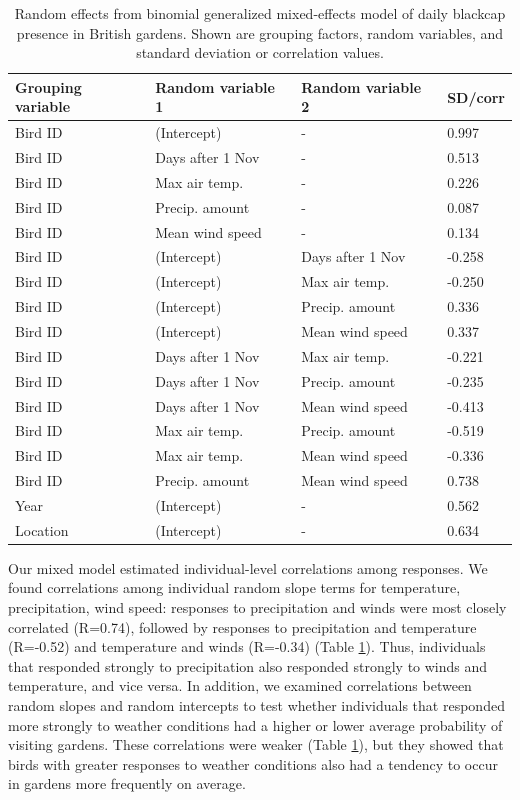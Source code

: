 \documentclass[a4paper, twoside]{templates/ociamthesis}
\begin{document}
\begin{table}[t]

\caption{\label{tab:indiv-model-table}Random effects from binomial generalized mixed-effects model of daily blackcap presence in British gardens. Shown are grouping factors, random variables, and standard deviation or correlation values.}
\centering
\begin{tabular}{l|l|l|l}
\hline
Grouping variable & Random variable 1 & Random variable 2 & SD/corr\\
\hline
Bird ID & (Intercept) & - & 0.997\\
\hline
Bird ID & Days after 1 Nov & - & 0.513\\
\hline
Bird ID & Max air temp. & - & 0.226\\
\hline
Bird ID & Precip. amount & - & 0.087\\
\hline
Bird ID & Mean wind speed & - & 0.134\\
\hline
Bird ID & (Intercept) & Days after 1 Nov & -0.258\\
\hline
Bird ID & (Intercept) & Max air temp. & -0.250\\
\hline
Bird ID & (Intercept) & Precip. amount & 0.336\\
\hline
Bird ID & (Intercept) & Mean wind speed & 0.337\\
\hline
Bird ID & Days after 1 Nov & Max air temp. & -0.221\\
\hline
Bird ID & Days after 1 Nov & Precip. amount & -0.235\\
\hline
Bird ID & Days after 1 Nov & Mean wind speed & -0.413\\
\hline
Bird ID & Max air temp. & Precip. amount & -0.519\\
\hline
Bird ID & Max air temp. & Mean wind speed & -0.336\\
\hline
Bird ID & Precip. amount & Mean wind speed & 0.738\\
\hline
Year & (Intercept) & - & 0.562\\
\hline
Location & (Intercept) & - & 0.634\\
\hline
\end{tabular}
\end{table}

Our mixed model estimated individual-level correlations among responses. We found correlations among individual random slope terms for temperature, precipitation, wind speed: responses to precipitation and winds were most closely correlated (R=0.74), followed by responses to precipitation and temperature (R=-0.52) and temperature and winds (R=-0.34) (Table \ref{tab:indiv-model-table}). Thus, individuals that responded strongly to precipitation also responded strongly to winds and temperature, and vice versa. In addition, we examined correlations between random slopes and random intercepts to test whether individuals that responded more strongly to weather conditions had a higher or lower average probability of visiting gardens. These correlations were weaker (Table \ref{tab:indiv-model-table}), but they showed that birds with greater responses to weather conditions also had a tendency to occur in gardens more frequently on average.
\end{document}
